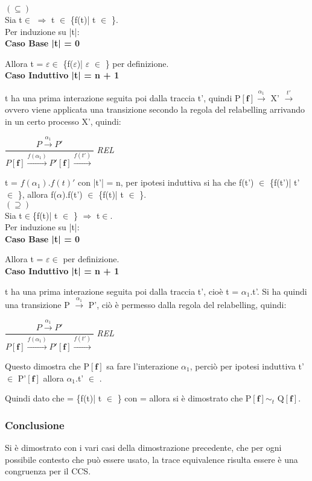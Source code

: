 $(\subseteq)$ \\

Sia t$\in$  $\Rightarrow$ t $\in$ \{f(t)| t $\in$ \}. \\
Per induzione su |t|:
\\

\textbf{Caso Base |t| = 0}

Allora t = $\varepsilon \in$ \{f($\varepsilon$)| $\varepsilon$ $\in$ \} per definizione.\\


\textbf{Caso Induttivo |t| = n + 1}

t ha una prima interazione seguita poi dalla traccia t', quindi P$\mathbf{[f]}  \overset{\alpha_{1}}\rightarrow $ X' $\overset{t'}\rightarrow$ ovvero viene applicata una transizione secondo la regola del relabelling arrivando in un certo processo X', quindi:

$\dfrac{P \overset{\alpha_{1}}\rightarrow P'}{P \mathbf{[f]} \overset{f(\alpha_{1})}\rightarrow P'\mathbf{[f]}\overset{f(t')}\rightarrow}$ \textit{REL} 

t = $f(\alpha_{1}).f(t)'$ con |t'| = n, per ipotesi induttiva si ha che f(t') $\in$ \{f(t')| t' $\in$ \}, allora f($\alpha$).f(t') $\in$ \{f(t)| t $\in$ \}.\\

$(\supseteq)$ \\

Sia t$\in$\{f(t)| t $\in$ \}  $\Rightarrow$ t$\in$. \\
Per induzione su |t|:\\

\textbf{Caso Base |t| = 0}

Allora t = $\varepsilon \in$  per definizione.\\

\textbf{Caso Induttivo |t| = n + 1}

t ha una prima interazione seguita poi dalla traccia t', cioè t = $\alpha_{1}$.t'. Si ha quindi una transizione P $\overset{\alpha_{1}}\rightarrow$ P', ciò è permesso dalla regola del relabelling, quindi:

$\dfrac{P \overset{\alpha_{1}}\rightarrow P'}{P \mathbf{[f]} \overset{f(\alpha_{1})}\rightarrow P'\mathbf{[f]}\overset{f(t')}\rightarrow}$ \textit{REL} 

Questo dimostra che P$\mathbf{[f]}$ sa fare l'interazione $\alpha_{1}$, perciò per ipotesi induttiva t'$\in$ P'$\mathbf{[f]}$ allora $\alpha_{1}$.t' $\in$ .

Quindi dato che  = \{f(t)| t $\in$ \} con  =  allora si è dimostrato che  P$\mathbf{[f]}\sim_{t}$ Q$\mathbf{[f]}$.\\

\subsubsection{Conclusione}
Si è dimostrato con i vari casi della dimostrazione precedente, che per ogni possibile contesto che può essere usato, la trace equivalence risulta essere è una congruenza per il CCS. 
\pagebreak